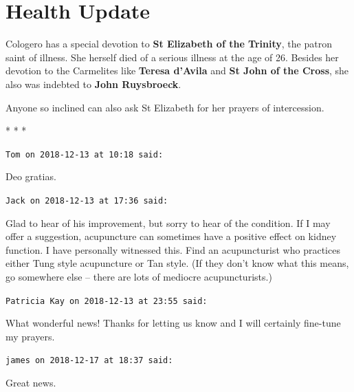 \section{Health Update}

Cologero has a special devotion to \textbf{St Elizabeth of the Trinity}, the patron saint of illness. She herself died of a serious illness at the age of 26. Besides her devotion to the Carmelites like
\textbf{Teresa d'Avila} and \textbf{St John of the Cross}, she also was indebted to \textbf{John Ruysbroeck}.

Anyone so inclined can also ask St Elizabeth for her prayers of intercession.



\begin{center}* * *\end{center}

\begin{footnotesize}
\begin{sffamily}
\texttt{Tom on 2018-12-13 at 10:18 said:}

Deo gratias.

\hfill

\texttt{Jack on 2018-12-13 at 17:36 said:}

Glad to hear of his improvement, but sorry to hear of the condition. If I may offer a suggestion, acupuncture can sometimes have a positive effect on kidney function. I have personally witnessed this. Find an acupuncturist who practices either Tung style acupuncture or Tan style. (If they don't know what this means, go somewhere else -- there are lots of mediocre acupuncturists.)

\hfill

\texttt{Patricia Kay on 2018-12-13 at 23:55 said:}

What wonderful news! Thanks for letting us know and I will certainly fine-tune my prayers.

\hfill

\texttt{james on 2018-12-17 at 18:37 said:}

Great news.


\hfill

\end{sffamily}
\end{footnotesize}

